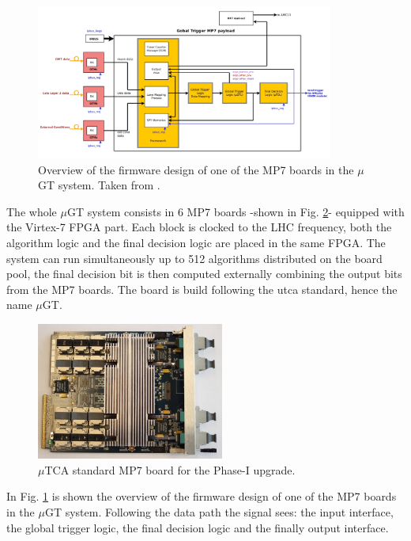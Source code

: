\documentclass[../../main.tex]{subfiles}
\begin{document}
\begin{figure}[h]
    \centering
    \includegraphics[width=0.87\textwidth]{sections/02/Images/P1GT-overview.jpg}
    \caption{Overview of the firmware design of one of the MP7 boards in the $\mu$GT system. Taken from \cite{uGT}.}
    \label{fig:uGT-firmware}
\end{figure}

The whole $\mu$GT system consists in 6 MP7 boards -shown in Fig. \ref{fig:Phase-1_MP7}- equipped with the Virtex-7 FPGA part. Each block is clocked to the LHC frequency, both the algorithm logic and the final decision logic are placed in the same FPGA. The system can run simultaneously up to 512 algorithms distributed on the board pool, the final decision bit is then computed externally combining the output bits from the MP7 boards. The board is build following the \acrshort{utca} standard, hence the name $\mu$GT.

\begin{figure}[h]
    \centering
    \includegraphics[width=0.55\textwidth]{sections/02/Images/MP7_board.jpg}
    \caption{$\mu$TCA standard MP7 board for the Phase-I upgrade.}
    \label{fig:Phase-1_MP7}
\end{figure}

In Fig. \ref{fig:uGT-firmware} is shown the overview of the firmware design of one of the MP7 boards in the $\mu$GT system. Following the data path the signal sees: the input interface, the global trigger logic, the final decision logic and the finally output interface. 
\end{document}
